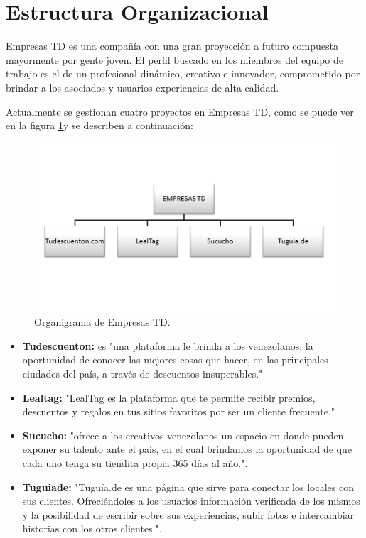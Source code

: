 \section{Estructura Organizacional} \label{sect:Estructura_organizacional}

Empresas TD es una compañía con una gran proyección a futuro compuesta mayormente 
por gente joven. El perfil buscado en los miembros del equipo de trabajo es el de 
un profesional dinámico, creativo e innovador, comprometido por brindar a los
asociados y usuarios experiencias de alta calidad. 

Actualmente se gestionan cuatro proyectos en Empresas TD, como se puede ver en la figura \ref{fig:ogtd}y se describen a continuación:

\begin{figure}[h]
	\begin{center}
		\includegraphics[scale=0.4]{imagenes/OrganigramaTD.png}
	\end{center}
	\caption{
		\label{fig:ogtd}
		Organigrama de Empresas TD.
	}
\end{figure}



\begin{itemize}
  \item \textbf{Tudescuenton:} es "una plataforma le brinda a los venezolanos, la oportunidad de conocer las mejores cosas que hacer, en las principales ciudades del país, a través de descuentos insuperables." \cite{TDC}
  \item \textbf{Lealtag:} "LealTag es la plataforma que te permite recibir premios, descuentos y regalos en tus sitios favoritos por ser un cliente frecuente."\cite{LTG}
  \item \textbf{Sucucho:} "ofrece a los creativos venezolanos un espacio en donde pueden exponer su talento ante el país, en el cual brindamos la oportunidad de que cada uno tenga su tiendita propia 365 días al año."\cite{SCC}.
  \item \textbf{Tuguiade:} "Tuguía.de es una página que sirve para conectar los locales con sus clientes. Ofreciéndoles a los usuarios información verificada de los mismos y la posibilidad de escribir sobre sus experiencias, subir fotos e intercambiar historias con los otros clientes."\cite{TGD}. 
\end{itemize}
  
